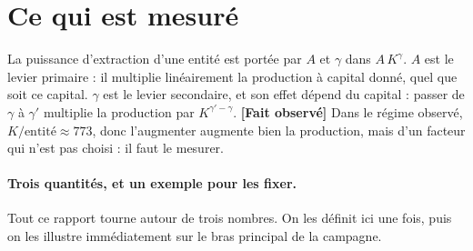 \documentclass[11pt,a4paper]{article}
\newcommand{\code}[1]{\texttt{#1}}
\newcommand{\Kaut}{K^{*}_{\mathrm{aut}}}
\newcommand{\fait}{\textbf{[Fait observé]}}
\begin{document}
\begin{abstract}
\textbf{Une grandeur unique, la « tension » $T = \Kaut/K_{\text{eq}}$,
résume ces effets d'échelle} (§\ref{sec:tension}) : le rapport entre le
capital d'équilibre d'une entité isolée et le capital auquel le système
tourne réellement. Le système observé tourne à un treizième de son échelle
autarcique, et la mortalité y suit $T^{0{,}67}$ à $1{,}4$\,\% près sur une
plage $\times15$ atteinte par trois leviers différents --- deux
interventions sans rapport ($K_0/4$ et $A\times2$) qui amènent à la même
tension donnent la même mortalité à $0{,}5$\,\% près. \textbf{Mais la tension
n'est pas un paramètre d'état} : un balayage à quatre leviers la met en
échec sur la dépréciation $\delta$, où elle varie d'un facteur 13 pour une
mortalité qui ne bouge que de 14\,\%. Ce qui aligne les quatre leviers est
l'intensité de rotation du crédit, avec $R^2 = 0{,}998$ --- une variable
endogène, qui désigne le canal sans le démontrer.

Un résultat méthodologique conditionne les précédents : le raisonnement du
prompt (§2) selon lequel la portée \code{fraction} « fixe l'intensité de
traitement » ne tient pas dans ce modèle. La part de production détenue
par la cohorte traitée passe de $0{,}198$ à $0{,}022$ en 2000 pas. Les
deux portées dérivent ; \code{fraction} dérive vers le bas.
\end{abstract}

\tableofcontents



\section{Ce qui est mesuré}

La puissance d'extraction d'une entité est portée par $A$ et $\gamma$ dans
$A\,K^{\gamma}$. $A$ est le levier primaire : il multiplie linéairement la
production à capital donné, quel que soit ce capital. $\gamma$ est le levier
secondaire, et son effet dépend du capital : passer de $\gamma$ à
$\gamma'$ multiplie la production par $K^{\gamma'-\gamma}$. \fait{} Dans le
régime observé, $K/\text{entité} \approx 773$, donc l'augmenter augmente
bien la production, mais d'un facteur qui n'est pas choisi : il faut le
mesurer.

\paragraph{Trois quantités, et un exemple pour les fixer.} Tout ce rapport
tourne autour de trois nombres. On les définit ici une fois, puis on les
illustre immédiatement sur le bras principal de la campagne.
\end{document}
